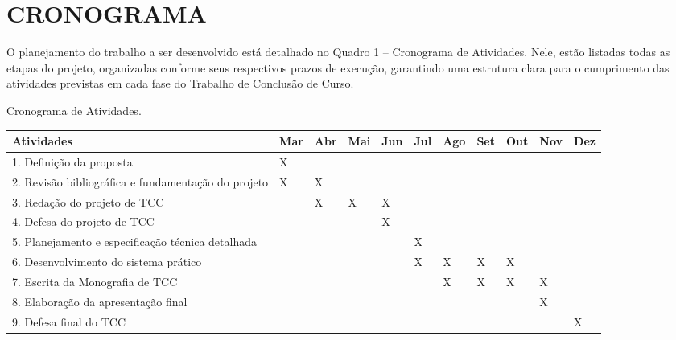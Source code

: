 \section{CRONOGRAMA}
\label{sec:planejamento}
O planejamento do trabalho a ser desenvolvido está detalhado no Quadro 1 – Cronograma de Atividades. Nele, estão listadas todas as etapas do projeto, organizadas conforme seus respectivos prazos de execução, garantindo uma estrutura clara para o cumprimento das atividades previstas em cada fase do Trabalho de Conclusão de Curso.

\begin{quadro}[H]
    \caption{Cronograma de Atividades.\label{qua:quadro1}}
    \begin{tabular}{|p{4.5cm}|p{0.7cm}|p{0.7cm}|p{0.7cm}|p{0.7cm}|p{0.7cm}|p{0.7cm}|p{0.7cm}|p{0.7cm}|p{0.7cm}|p{0.7cm}|}
        \hline
        \textbf{Atividades} & \textbf{Mar} & \textbf{Abr} & \textbf{Mai} & \textbf{Jun} & \textbf{Jul} & \textbf{Ago} & \textbf{Set} & \textbf{Out} & \textbf{Nov} & \textbf{Dez} \\
        \hline
        \small{1. Definição da proposta} & X &   &   &   &   &   &   &   &   &  \\
        \hline
        \small{2. Revisão bibliográfica e fundamentação do projeto} & X & X &   &   &   &   &   &   &   &  \\
        \hline
	\small{3. Redação do projeto de TCC} &   & X & X & X &   &   &   &   &   &  \\
        \hline
	\small{4. Defesa do projeto de TCC} &   &   &   & X &   &   &   &   &   &  \\
        \hline
	\small{5. Planejamento e especificação técnica detalhada} &   &   &   &   & X &   &   &   &   &  \\
        \hline
	\small{6. Desenvolvimento do sistema prático} &   &   &   &   & X & X & X & X &   &  \\
        \hline
        \small{7. Escrita da Monografia de TCC} &   &   &   &   &  & X & X & X & X &  \\
        \hline
        \small{8. Elaboração da apresentação final} &   &   &   &   &  &  &  &  & X &  \\
        \hline
	\small{9. Defesa final do TCC} &   &   &   &   &   &   &   &   &  & X\\
        \hline
    \end{tabular}
\end{quadro}

